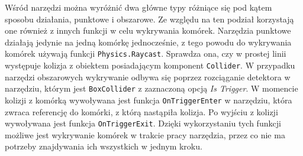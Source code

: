 Wśród narzędzi można wyróżnić dwa główne typy różniące się pod kątem sposobu działania, punktowe i obszarowe.
Ze względu na ten podział korzystają one również z innych funkcji w celu wykrywania komórek.
Narzędzia punktowe działają jedynie na jedną komórkę jednocześnie,
z tego powodu do wykrywania komórek używają funkcji \texttt{Physics.Raycast}.
Sprawdza ona, czy w prostej linii występuje kolizja z obiektem posiadającym komponent \texttt{Collider}.
W przypadku narzędzi obszarowych wykrywanie odbywa się poprzez rozciąganie detektora w narzędziu,
którym jest \texttt{BoxCollider} z zaznaczoną opcją \textit{Is Trigger}.
W momencie kolizji z komórką wywoływana jest funkcja \texttt{OnTriggerEnter} w narzędziu,
która zwraca referencję do komórki, z którą nastąpiła kolizja.
Po wyjściu z kolizji wywoływana jest funkcja \texttt{OnTriggerExit}.
Dzięki wykorzystaniu tych funkcji możliwe jest wykrywanie komórek w trakcie pracy narzędzia,
przez co nie ma potrzeby znajdywania ich wszystkich w jednym kroku.
